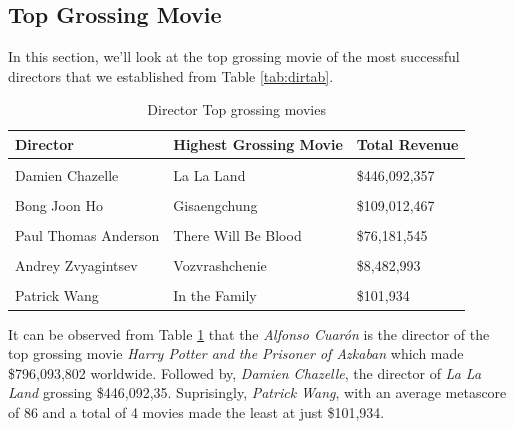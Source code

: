 \documentclass[11pt,a4paper,]{article}
\begin{document}
\hypertarget{top-grossing-movie}{%
\subsection{Top Grossing Movie}\label{top-grossing-movie}}

In this section, we'll look at the top grossing movie of the most successful directors that we established from Table \ref{tab:dirtab}.

\begin{table}[!h]

\caption{\label{tab:dirtab2}Director Top grossing movies}
\centering
\begin{tabular}[t]{l|l|l}
\hline
Director & Highest Grossing Movie & Total Revenue\\
\hline
\cellcolor{gray!6}{Alfonso CuarÃ³n} & \cellcolor{gray!6}{Harry Potter and the Prisoner of Azkaban} & \cellcolor{gray!6}{\$796,093,802}\\
\hline
Damien Chazelle & La La Land & \$446,092,357\\
\hline
\cellcolor{gray!6}{Steve McQueen} & \cellcolor{gray!6}{12 Years a Slave} & \cellcolor{gray!6}{\$187,733,202}\\
\hline
Bong Joon Ho & Gisaengchung & \$109,012,467\\
\hline
\cellcolor{gray!6}{Spike Jonze} & \cellcolor{gray!6}{Where the Wild Things Are} & \cellcolor{gray!6}{\$100,086,793}\\
\hline
Paul Thomas Anderson & There Will Be Blood & \$76,181,545\\
\hline
\cellcolor{gray!6}{Mike Leigh} & \cellcolor{gray!6}{Mr. Turner} & \cellcolor{gray!6}{\$22,179,785}\\
\hline
Andrey Zvyagintsev & Vozvrashchenie & \$8,482,993\\
\hline
\cellcolor{gray!6}{Nuri Bilge Ceylan} & \cellcolor{gray!6}{Kis Uykusu} & \cellcolor{gray!6}{\$4,018,705}\\
\hline
Patrick Wang & In the Family & \$101,934\\
\hline
\end{tabular}
\end{table}

It can be observed from Table \ref{tab:dirtab2} that the \emph{Alfonso Cuarón} is the director of the top grossing movie \emph{Harry Potter and the Prisoner of Azkaban} which made \$796,093,802 worldwide. Followed by, \emph{Damien Chazelle}, the director of \emph{La La Land} grossing \$446,092,35. Suprisingly, \emph{Patrick Wang}, with an average metascore of 86 and a total of 4 movies made the least at just \$101,934.
\end{document}
